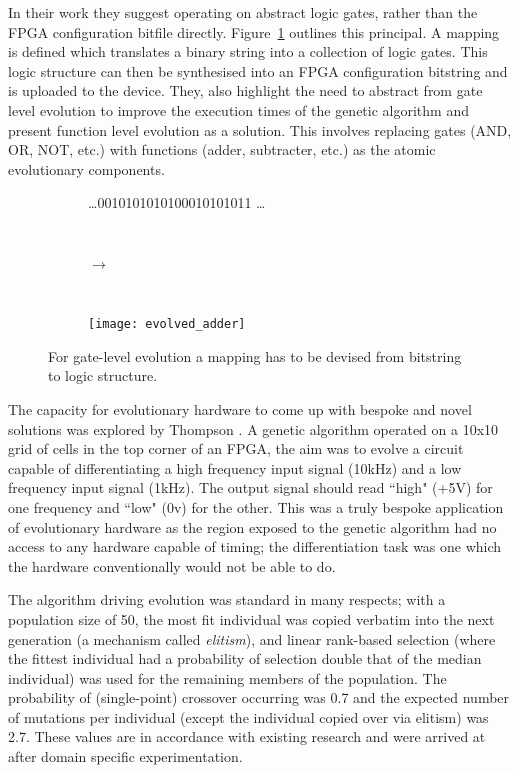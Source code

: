 In their work they suggest operating on abstract logic gates, rather than the
FPGA configuration bitfile directly. Figure~\ref{fig:mapping}
outlines this principal.
A mapping is defined which translates a binary string into a collection of
logic gates. This logic structure can then be synthesised into an FPGA configuration
bitstring and is uploaded to the device.
They, also highlight the need to abstract from gate level evolution to improve the
execution times of the genetic algorithm and present function level evolution
as a solution. This involves replacing gates (AND, OR, NOT, etc.) with functions
(adder, subtracter, etc.) as the atomic evolutionary components.

\begin{figure}
	\centering
	\begin{subfigure}[ht]{0.4\textwidth}
		\centering
		\ldots 0010101010100010101011 \ldots
	\end{subfigure}
	~
	\begin{subfigure}[ht]{0.1\textwidth}
		$\rightarrow$
	\end{subfigure}
	~
	\begin{subfigure}[ht]{0.4\textwidth}
		\texttt{[image: evolved\_adder]}
	\end{subfigure}
	\caption{For gate-level evolution a mapping has to be devised from bitstring to logic structure.}
	\label{fig:mapping}
\end{figure}

The capacity for evolutionary hardware to come up with bespoke and novel solutions
was explored by Thompson \cite{10.1007/3-540-63173-9_61}. A genetic algorithm
operated on a 10x10 grid of cells in the top corner of an FPGA, the aim was to evolve
a circuit capable of differentiating a high frequency input signal (10kHz) and a
low frequency input signal (1kHz). The output signal should read ``high" (+5V) for one frequency
and ``low" (0v) for the other. This was a truly bespoke application of evolutionary
hardware as the region exposed to the genetic algorithm had no access to any
hardware capable of timing; the differentiation task was one which the hardware
conventionally would not be able to do.

The algorithm driving evolution was standard in many respects; with a population size of 50,
the most fit individual was copied verbatim into the next generation (a mechanism
called {\em elitism}), and linear rank-based selection (where the fittest
individual had a probability of selection double that of the median individual)
was used for the remaining members of the population. The probability of (single-point)
crossover occurring was 0.7 and the expected number of mutations per individual
(except the individual copied over via elitism) was 2.7. These values are in
accordance with existing research and were arrived at after domain specific
experimentation.

